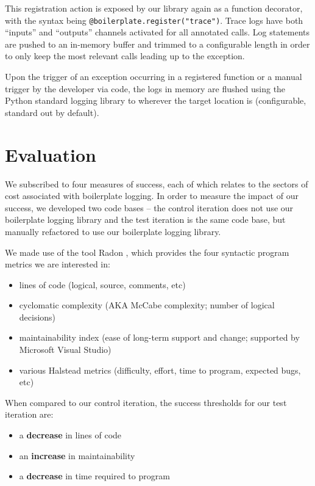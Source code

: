 \documentclass[acmsmall,review,authorversion]{acmart}
\newcommand{\code}[1]{\lstinline[basicstyle=\ttfamily\small]~#1~}
\begin{document}
This registration action is exposed by our library again as a function decorator, with the syntax being \code{@boilerplate.register("trace")}. Trace logs have both ``inputs'' and ``outputs'' channels activated for all annotated calls. Log statements are pushed to an in-memory buffer and trimmed to a configurable length in order to only keep the most relevant calls leading up to the exception.

Upon the trigger of an exception occurring in a registered function or a manual trigger by the developer via code, the logs in memory are flushed using the Python standard logging library to wherever the target location is (configurable, standard out by default).


\section{Evaluation}

We subscribed to four measures of success, each of which relates to the sectors of cost associated with boilerplate logging. In order to measure the impact of our success, we developed two code bases -- the control iteration does not use our boilerplate logging library and the test iteration is the same code base, but manually refactored to use our boilerplate logging library.

We made use of the tool Radon \cite{radon}, which provides the four syntactic program metrics we are interested in:

\begin{itemize}
    \item lines of code (logical, source, comments, etc)
    \item cyclomatic complexity  \cite{wiki:mccabe} (AKA McCabe complexity; number of logical decisions)
    \item maintainability index (ease of long-term support and change; supported by Microsoft Visual Studio)
    \item various Halstead metrics \cite{wiki:halstead} (difficulty, effort, time to program, expected bugs, etc)
\end{itemize}

When compared to our control iteration, the success thresholds for our test iteration are:

\begin{itemize}
    \item a \textbf{decrease} in lines of code
    \item an \textbf{increase} in maintainability
    \item a \textbf{decrease} in time required to program
\end{itemize}
\end{document}
